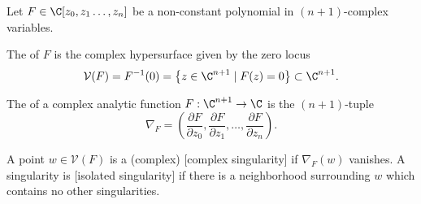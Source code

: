 \providecommand{\V}{\mathcal{V}}
\renewcommand{\L}{\mathcal{L}}
%

%

Let $F\in \C[z_0,z_1\ldots, z_n]$ be a non-constant polynomial in $(n+1)$-complex variables.
\begin{definition}
	The  of $F$ is the complex hypersurface given by the zero locus
	\[
		\V(F) = F^{-1}(0)=\left\{ z \in \C^{n+1} \mid F(z)=0\right\} \subset \C^{n+1}.
	\]
\end{definition}


\begin{definition}
	The  of a complex analytic function $F : \C^{n+1} \to \C$ is the $(n+1)$-tuple
	\[
		\nabla_F = \left(\frac{\partial F}{\partial z_0}, \frac{\partial F}{\partial z_1},\ldots, \frac{\partial F}{\partial z_n}\right).
	\]
\end{definition}

\begin{definition}
	A point $w\in \V(F)$ is a (complex) [complex singularity] if $\nabla_F(w)$ vanishes. A singularity is [isolated singularity] if there is a neighborhood surrounding $w$ which contains no other singularities.
\end{definition}

